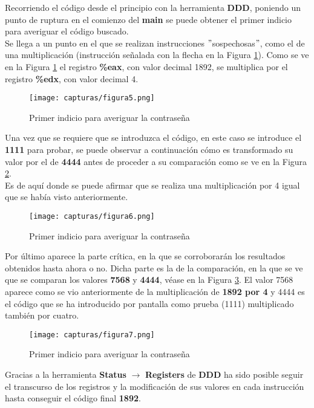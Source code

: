 	Recorriendo el código desde el principio con la herramienta \textbf{DDD}, poniendo un punto de ruptura en el comienzo del \textbf{main} se puede obtener el primer indicio para averiguar el código buscado. 
	\\
	
	Se llega a un punto en el que se realizan instrucciones $ " $sospechosas$ " $, como el de una multiplicación (instrucción señalada con la flecha en la Figura \ref{fig:figura5}). Como se ve en la Figura \ref{fig:figura5} el registro \textbf{\%eax}, con valor decimal 1892, se multiplica por el registro \textbf{\%edx}, con valor decimal 4.
	
	\begin{figure}[H] %
		\centering
		\texttt{[image: capturas/figura5.png]} 
		\caption{Primer indicio para averiguar la contraseña} 
		\label{fig:figura5}
	\end{figure}
	
	Una vez que se requiere que se introduzca el código, en este caso se introduce el \textbf{1111} para probar, se puede observar a continuación cómo es transformado su valor por el de \textbf{4444} antes de proceder a su comparación como se ve en la Figura \ref{fig:figura6}. 
	\\
	
	Es de aquí donde se puede afirmar que se realiza una multiplicación por 4 igual que se había visto anteriormente.
	
	\begin{figure}[H] %
		\centering
		\texttt{[image: capturas/figura6.png]} 
		\caption{Primer indicio para averiguar la contraseña} 
		\label{fig:figura6}
	\end{figure}
	
	Por último aparece la parte crítica, en la que se corroborarán los resultados obtenidos hasta ahora o no. Dicha parte es la de la comparación, en la que se ve que se comparan los valores \textbf{7568} y \textbf{4444}, véase en la Figura \ref{fig:figura7}. El valor 7568 aparece como se vio anteriormente de la multiplicación de \textbf{1892 por 4} y 4444 es el código que se ha introducido por pantalla como prueba (1111) multiplicado también por cuatro.
	
	\begin{figure}[H] %
		\centering
		\texttt{[image: capturas/figura7.png]} 
		\caption{Primer indicio para averiguar la contraseña} 
		\label{fig:figura7}
	\end{figure}
	
	Gracias a la herramienta \textbf{Status} $ \rightarrow $ \textbf{Registers} de \textbf{DDD} ha sido posible seguir el transcurso de los registros y la modificación de sus valores en cada instrucción hasta conseguir el código final \textbf{1892}.
	
\newpage


